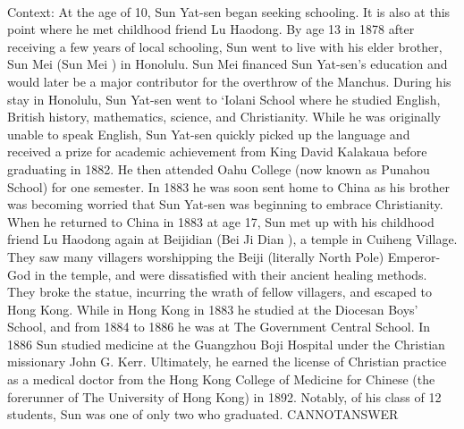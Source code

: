\documentclass[11pt,a4paper, onecolumn]{article}
\begin{document}
\\ Context: At the age of 10, Sun Yat-sen began seeking schooling. It is also at this point where he met childhood friend Lu Haodong. By age 13 in 1878 after receiving a few years of local schooling, Sun went to live with his elder brother, Sun Mei (Sun Mei ) in Honolulu. Sun Mei financed Sun Yat-sen's education and would later be a major contributor for the overthrow of the Manchus. During his stay in Honolulu, Sun Yat-sen went to `Iolani School where he studied English, British history, mathematics, science, and Christianity. While he was originally unable to speak English, Sun Yat-sen quickly picked up the language and received a prize for academic achievement from King David Kalakaua before graduating in 1882. He then attended Oahu College (now known as Punahou School) for one semester. In 1883 he was soon sent home to China as his brother was becoming worried that Sun Yat-sen was beginning to embrace Christianity. When he returned to China in 1883 at age 17, Sun met up with his childhood friend Lu Haodong again at Beijidian (Bei Ji Dian ), a temple in Cuiheng Village. They saw many villagers worshipping the Beiji (literally North Pole) Emperor-God in the temple, and were dissatisfied with their ancient healing methods. They broke the statue, incurring the wrath of fellow villagers, and escaped to Hong Kong. While in Hong Kong in 1883 he studied at the Diocesan Boys' School, and from 1884 to 1886 he was at The Government Central School. In 1886 Sun studied medicine at the Guangzhou Boji Hospital under the Christian missionary John G. Kerr. Ultimately, he earned the license of Christian practice as a medical doctor from the Hong Kong College of Medicine for Chinese (the forerunner of The University of Hong Kong) in 1892. Notably, of his class of 12 students, Sun was one of only two who graduated. CANNOTANSWER
\end{document}
